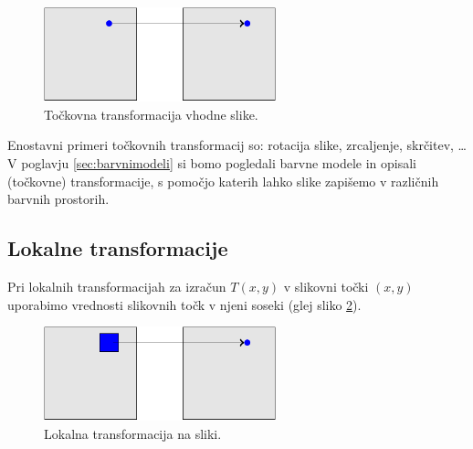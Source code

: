%
\begin{figure}[htbp]
  \centering
  \includegraphics[width=0.6\textwidth]{./slike-latex/tockovnaT}
  \caption{Točkovna transformacija vhodne slike.}
  \label{fig:tockovnaT}
\end{figure}
%

Enostavni primeri točkovnih transformacij so: rotacija slike, zrcaljenje, skrčitev, \ldots %
V poglavju \ref{sec:barvnimodeli} si bomo pogledali barvne modele in opisali (točkovne) transformacije, s pomočjo katerih lahko slike zapišemo v različnih barvnih prostorih.
\subsection{Lokalne transformacije}\label{sec:LokalneTransformacije}
%
Pri lokalnih transformacijah za izračun $T(x, y)$ v slikovni točki $(x, y)$ uporabimo vrednosti slikovnih točk v njeni soseki (glej sliko \ref{fig:lokalnaT}).

%
\begin{figure}[htbp]
  \centering
  \includegraphics[width=0.6\textwidth]{./slike-latex/lokalnaT}
  \caption{Lokalna transformacija na sliki.}
  \label{fig:lokalnaT}
\end{figure}
%

